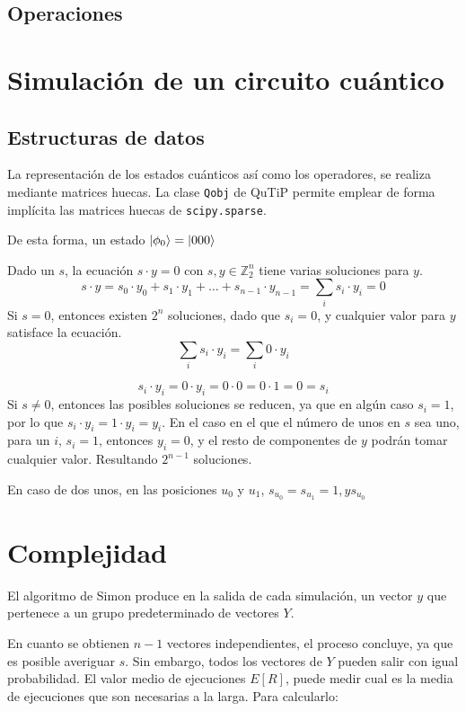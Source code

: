 \documentclass{article}
\theoremstyle{definition}
\begin{document}
\subsection{Operaciones}

\newpage

\section{Simulación de un circuito cuántico}
\subsection{Estructuras de datos}
La representación de los estados cuánticos así como los operadores, se realiza
mediante matrices huecas. La clase \texttt{Qobj} de QuTiP permite emplear de
forma implícita las matrices huecas de \texttt{scipy.sparse}.

De esta forma, un estado $\ket{\phi_0} = \ket{000} $

\newpage

Dado un $s$, la ecuación $s \cdot y = 0$ con $s, y \in \mathbb Z_2^n$ tiene 
varias soluciones para $y$.
$$ s \cdot y = s_0 \cdot y_0 + s_1 \cdot y_1 + \ldots + s_{n-1} \cdot y_{n-1} = 
\sum_{i}{s_i \cdot y_i} = 0$$
Si $s = 0$, entonces existen $2^n$ soluciones, dado que $s_i = 0$, y cualquier 
valor para $y$ satisface la ecuación.
$$ \sum_{i}{s_i \cdot y_i} = \sum_{i}{0 \cdot y_i} $$

$$ s_i \cdot y_i = 0 \cdot y_i = 0 \cdot 0 = 0 \cdot 1 = 0 = s_i$$
Si $s \neq 0$, entonces las posibles soluciones se reducen, ya que en algún caso 
$s_i = 1$, por lo que $s_i \cdot y_i = 1 \cdot y_i = y_i$.
En el caso en el que el número de unos en $s$ sea uno, para un $i$, $s_i = 1$, 
entonces $y_i = 0$, y el resto de componentes de $y$ podrán tomar cualquier 
valor. Resultando $2^{n-1}$ soluciones.

En caso de dos unos, en las posiciones $u_0$ y $u_1$, $s_{u_0} = s_{u_1} = 1, y 
s_{u_0}$

\section{Complejidad}

El algoritmo de Simon produce en la salida de cada simulación, un vector $y$ que
pertenece a un grupo predeterminado de vectores $Y$.

En cuanto se obtienen $n-1$ vectores independientes, el proceso concluye, ya que
es posible averiguar $s$. Sin embargo, todos los vectores de $Y$ pueden salir
con igual probabilidad. El valor medio de ejecuciones $E[R]$, puede medir cual
es la media de ejecuciones que son necesarias a la larga. Para calcularlo:
\end{document}
